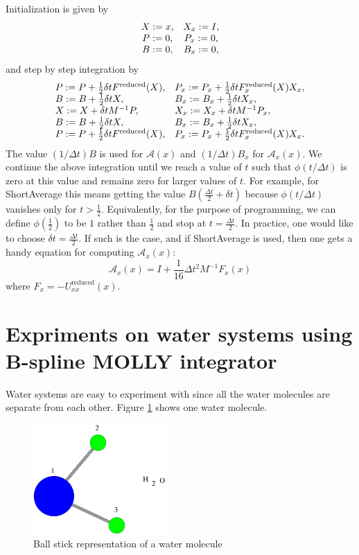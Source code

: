 \documentclass[11pt]{article}
\begin{document}
Initialization is given by
\begin{equation}
\begin{array}
[c]{cc}
X:=x, & X_{x}:=I,\\
P:=0, & P_{x}:=0,\\
B:=0, & B_{x}:=0,
\end{array}
\end{equation}
and step by step integration by
\begin{equation}
\begin{array}
[c]{ll}
P:=P+\frac{1}{2}\delta tF^{\mathrm{reduced}}(X), & P_{x}:=P_{x}+\frac{1}
{2}\delta tF_{x}^{\mathrm{reduced}}(X)X_{x},\\
B:=B+\frac{1}{2}\delta tX, & B_{x}:=B_{x}+\frac{1}{2}\delta tX_{x},\\
X:=X+\delta tM^{-1}P, & X_{x}:=X_{x}+\delta tM^{-1}P_{x},\\
B:=B+\frac{1}{2}\delta tX, & B_{x}:=B_{x}+\frac{1}{2}\delta tX_{x},\\
P:=P+\frac{1}{2}\delta tF^{\mathrm{reduced}}(X), & P_{x}:=P_{x}+\frac{1}
{2}\delta tF_{x}^{\mathrm{reduced}}(X)X_{x}.
\end{array}
\end{equation}
The value $(1/\Delta t)B$ is used for $\mathcal{A}(x)$ and $(1/\Delta t)B_{x}$
for $\mathcal{A}_{x}(x)$. We continue the above integration until we
reach a value of $t$ such that $\phi(t/\Delta t)$ is zero at this
value and remains zero for larger values of $t.$ For example, for
ShortAverage this means getting the value $B(\frac{\Delta t}{2} +
\delta t)$ because $\phi(t/\Delta t)$ vanishes only for
$t>\frac{1}{2}.$ Equivalently, for the purpose of programming, we can
define $\phi(\frac{1}{2})$ to be $1$ rather than $\frac{1}{2}$ and stop 
at $t = \frac{\Delta t}{2}.$  In practice, one would like to choose
$\delta t = \frac{\Delta t}{2}.$ If such is the case, and
if ShortAverage is used, then one gets a handy equation for computing 
$\mathcal{A}_{x}(x):$
\begin{equation}
\label{eqn:ax}
\mathcal{A}_{x}(x) = I + \frac{1}{16} \Delta t^2 M^{-1} F_x(x)
\end{equation}
where $F_x = - U^\mathrm{reduced}_{xx}(x).$


\section{Expriments on water systems using B-spline MOLLY integrator}
Water systems are easy to experiment with since all the water
molecules are separate from each other. Figure \ref{fig:water} shows
one water molecule.
\begin{figure}[hbt]
\centerline{\includegraphics[width=2.0in]{figs/water.pdf}}
\caption{Ball stick representation of a water molecule}
\label{fig:water}
\end{figure}
\end{document}
